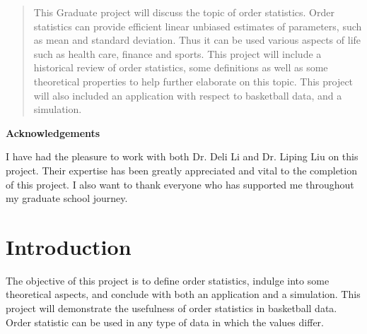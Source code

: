 \documentclass[11pt,a4paper]{article}
\theoremstyle{plain}
\begin{document}


\newpage

\begin{abstract}

This Graduate project will discuss the topic of order statistics. Order statistics can provide efficient linear unbiased estimates of parameters, such as mean and standard deviation. Thus it can be used various aspects of life such as health care, finance and sports. This project will include a historical review of order statistics, some definitions as well as some theoretical properties to help further elaborate on this topic. This project will also included an application with respect to basketball data, and a simulation. 

\end{abstract}

\newpage

\centerline{\bf Acknowledgements} \bigskip
I have had the pleasure to work with both Dr. Deli Li and Dr. Liping Liu on this project. Their expertise has been greatly appreciated and vital to the completion of this project. I also want to thank everyone who has supported me throughout my graduate school journey.  

\newpage 

\tableofcontents

\newpage
\section{Introduction}
The objective  of this project is to define order statistics, indulge into some theoretical aspects, and conclude with both an application and a simulation. This project will demonstrate the usefulness of order statistics in basketball data. Order statistic can be used in any type of data in which the values differ.
\end{document}
